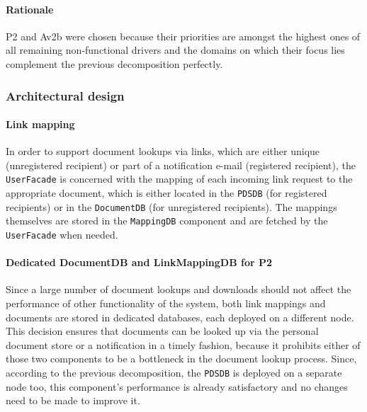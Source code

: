 \documentclass[a4paper,10pt]{article}
\begin{document}
\paragraph{Rationale}
P2 and Av2b were chosen because their priorities are amongst the highest ones of all remaining non-functional drivers and the domains on which their focus lies complement the previous decomposition perfectly.

\subsubsection{Architectural design}

\paragraph{Link mapping}
In order to support document lookups via links, which are either unique (unregistered recipient) or part of a notification e-mail (registered recipient), the \texttt{UserFacade} is concerned with the mapping of each incoming link request to the appropriate document, which is either located in the \texttt{PDSDB} (for registered recipients) or in the \texttt{DocumentDB} (for unregistered recipients). The mappings themselves are stored in the \texttt{MappingDB} component and are fetched by the \texttt{UserFacade} when needed.

\paragraph{Dedicated DocumentDB and LinkMappingDB for P2}
Since a large number of document lookups and downloads should not affect the performance of other functionality of the system, both link mappings and documents are stored in dedicated databases, each deployed on a different node. This decision ensures that documents can be looked up via the personal document store or a notification in a timely fashion, because it prohibits either of those two components to be a bottleneck in the document lookup process. Since, according to the previous decomposition, the \texttt{PDSDB} is deployed on a separate node too, this component's performance is already satisfactory and no changes need to be made to improve it.
\end{document}
